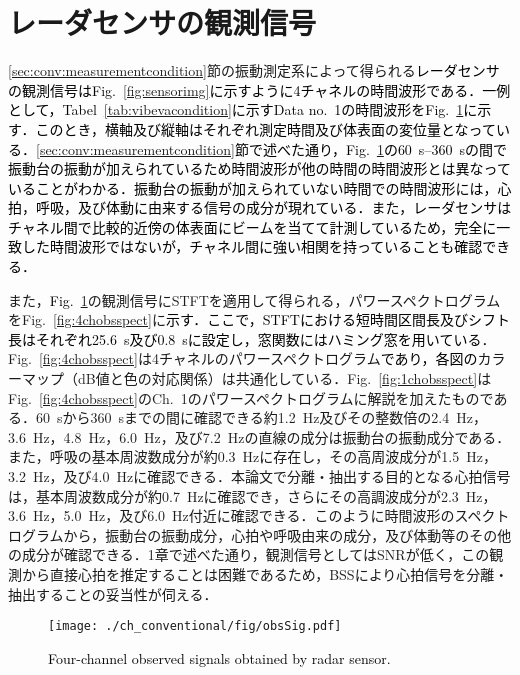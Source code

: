 \section{レーダセンサの観測信号}
\label{sec:conv:signal}
\ref{sec:conv:measurementcondition}節の{振動測定系}によって得られる\textcolor{black}{レーダセンサの観測信号はFig.~\ref{fig:sensorimg}に示すように4チャネルの時間波形である．一例として，Tabel~\ref{tab:vibevacondition}に示すData no.~1の時間波形をFig.~\ref{fig:obssig}に示す．このとき，横軸及び縦軸はそれぞれ測定時間及び体表面の変位量となっている．\ref{sec:conv:measurementcondition}節で述べた通り，Fig.~\ref{fig:obssig}の\textcolor{black}{60~s--360~s}の間で\textcolor{black}{振動台の振動}が加えられているため時間波形が他の時間の時間波形とは異なっていることがわかる．\textcolor{black}{振動台の振動}が加えられていない時間での時間波形には，心拍，呼吸，及び体動\textcolor{black}{に由来する信号の}成分が現れている．また，レーダセンサはチャネル間で\textcolor{black}{比較的近傍の体表面}にビームを当てて\textcolor{black}{計測}しているため，完全に一致した時間波形ではないが，チャネル間に強い相関を持っていることも確認できる．}

{また，\textcolor{black}{Fig.~\ref{fig:obssig}}の観測信号にSTFTを適用して得られる，パワースペクトログラムをFig.~\ref{fig:4chobsspect}に\textcolor{black}{示す．ここで，STFTにおける短時間区間長及びシフト長はそれぞれ25.6~s及び0.8~sに設定し，窓関数にはハミング窓を用いている}．Fig.~\ref{fig:4chobsspect}は4チャネルのパワースペクトログラム\textcolor{black}{であり，各図の}カラーマップ（dB値と色の対応関係）は共通化している．Fig.~\ref{fig:1chobsspect}はFig.~\ref{fig:4chobsspect}のCh.~1のパワースペクトログラムに解説を加えたものである．60~sから360~sまでの間に確認できる約1.2~Hz及びその整数倍の2.4~Hz，3.6~Hz，4.8~Hz，6.0~Hz，及び7.2~Hzの直線の成分は振動台の振動成分である．また，呼吸の基本周波数成分が約0.3~Hzに存在し，その高周波成分が1.5~Hz，3.2~Hz，及び4.0~Hzに確認できる．本論文で分離・抽出する目的となる心拍信号は，基本周波数成分が約0.7~Hzに確認でき，さらにその高調波成分が2.3~Hz，3.6~Hz，5.0~Hz，及び6.0~Hz付近に確認できる．このように時間波形のスペクトログラムから，振動台の振動成分，心拍や呼吸由来の成分，及び体動等のその他の成分が確認できる．1章で述べた通り，観測信号としてはSNRが低く，この観測から直接心拍を推定することは困難であるため，BSSにより心拍信号を分離・抽出することの妥当性が伺える．}

\begin{figure}[b]
\centering
\texttt{[image: ./ch\_conventional/fig/obsSig.pdf]}
\caption{\textcolor{black}{Four-channel observed signals obtained by radar sensor.}}
\label{fig:obssig}
\end{figure}

